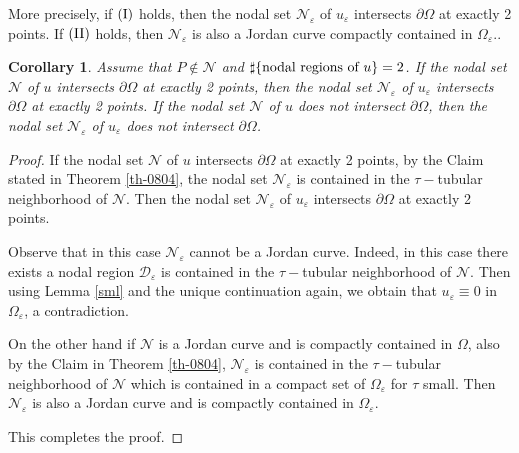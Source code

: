 \documentclass[11pt,reqno]{article}
\newtheorem{cor}[teo]{Corollary}
\numberwithin{equation}{section}
\newcommand\e\varepsilon
\renewcommand\O\Omega
\begin{document}
   More precisely, if $(\hbox{I})$ holds, then   the nodal set $\mathcal{N}_\e$ of $u_\e$ intersects $\partial \O$ at exactly 2 points. If $(\hbox{II})$ holds, then $\mathcal{N}_\e$ is also a Jordan curve  compactly contained in $\O_\e$..
   \begin{cor}\label{cor-intersect}
     Assume that $P\notin \mathcal{N}$ and $\sharp \{\hbox{nodal regions of } u\}=2$.  If the nodal set $\mathcal{N}$ of $u$ intersects $\partial \O$ at exactly 2 points, then the nodal set $\mathcal{N}_\e$ of $u_\e$ intersects $\partial \O$ at exactly 2 points. If the nodal set $\mathcal{N}$ of $u$ does not intersect $\partial \O$, then the nodal set $\mathcal{N}_\e$ of $u_\e$ does not intersect $\partial \O$. 
   \end{cor}
   \begin{proof}
      If  the nodal set $\mathcal{N}$ of $u$ intersects $\partial \O$ at exactly 2 points, by the Claim stated in Theorem \ref{th-0804},  the nodal set $\mathcal{N}_\e$ is contained in the $\tau-$tubular neighborhood of $\mathcal{N}$. Then  the nodal set $\mathcal{N}_\e$ of $u_\e$ intersects $\partial \O$ at exactly 2 points. 
      
       Observe that in this case $\mathcal{N}_\e$ cannot be a Jordan curve. Indeed, in this case there exists a nodal region $\mathcal{D}_\e$ is contained in   the $\tau-$tubular neighborhood of $\mathcal{N}$. Then using Lemma \ref{sml} and the unique continuation again, we obtain that $u_\e\equiv 0$ in $\O_\e$, a contradiction. 

       On the other hand if $\mathcal{N}$ is a Jordan curve and is compactly contained in $\O$, also by the Claim in Theorem \ref{th-0804}, $\mathcal{N}_\e$ is  contained in the $\tau-$tubular neighborhood of $\mathcal{N}$ which is contained in a compact set of $\O_\e$ for $\tau$ small. Then $\mathcal{N}_\e$ is also a Jordan curve and is compactly contained in $\O_\e$.

       This completes the proof.
   \end{proof}
\end{document}
